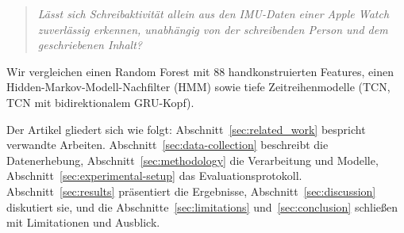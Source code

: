 \begin{quote}
\textit{Lässt sich Schreibaktivität allein aus den IMU-Daten einer Apple Watch zuverlässig erkennen, unabhängig von der schreibenden Person und dem geschriebenen Inhalt?}
\end{quote}

Wir vergleichen einen Random Forest mit 88 handkonstruierten Features, einen Hidden-Markov-Modell-Nachfilter (HMM) sowie tiefe Zeitreihenmodelle (TCN, TCN mit bidirektionalem GRU-Kopf).

Der Artikel gliedert sich wie folgt: Abschnitt~\ref{sec:related_work} bespricht verwandte Arbeiten. Abschnitt~\ref{sec:data-collection} beschreibt die Datenerhebung, Abschnitt~\ref{sec:methodology} die Verarbeitung und Modelle, Abschnitt~\ref{sec:experimental-setup} das Evaluationsprotokoll. Abschnitt~\ref{sec:results} präsentiert die Ergebnisse, Abschnitt~\ref{sec:discussion} diskutiert sie, und die Abschnitte~\ref{sec:limitations} und~\ref{sec:conclusion} schließen mit Limitationen und Ausblick.
